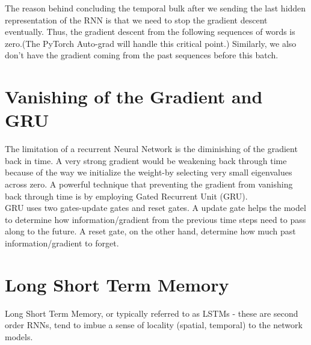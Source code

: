 The reason behind concluding the temporal bulk after we sending the last hidden representation of the RNN is that we need to stop the gradient descent eventually. Thus, the gradient descent from the following sequences of words is zero.(The PyTorch Auto-grad will handle this critical point.) Similarly, we also don't have the gradient coming from the past sequences before this batch.

\section{Vanishing of the Gradient and GRU}
The limitation of a recurrent Neural Network is the diminishing of the gradient back in time. A very strong gradient would be weakening back through time because of the way we initialize the weight-by selecting very small eigenvalues across zero. A powerful technique that preventing the gradient from vanishing back through time is by employing Gated Recurrent Unit (GRU).\\

GRU uses two gates-update gates and reset gates. A update gate helps the model to determine how information/gradient from the previous time steps need to pass along to the future. A reset gate, on the other hand, determine how much past information/gradient to forget. 

\section{Long Short Term Memory}
Long Short Term Memory, or typically referred to as LSTMs - these are second order RNNs, tend to imbue a sense of locality (spatial, temporal) to the network models.\\

